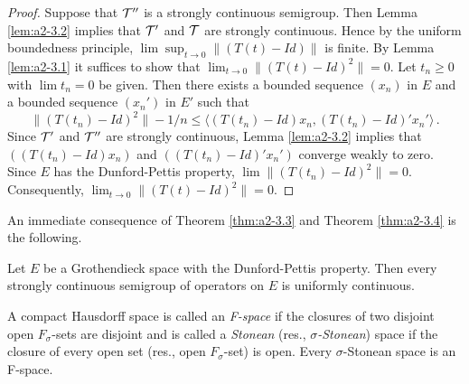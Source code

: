 \begin{proof}
Suppose that $\mathcal{T}''$ is a strongly continuous semigroup.
Then Lemma \ref{lem:a2-3.2}   implies that $\mathcal{T}'$ and $\mathcal{T}$ are strongly continuous.
Hence by the uniform boundedness principle, $\lim \sup_{t \to 0} \|(T(t) - Id)\|$ is finite.
By Lemma \ref{lem:a2-3.1}   it suffices to show that $\lim_{t \to 0} \|(T(t) - Id)^2\| = 0$.
Let $t_{n} \geq 0$ with $\lim t_{n} = 0$ be given.
Then there exists a bounded sequence $(x_{n})$ in $E$ and a bounded sequence $(x_{n}')$ in $E'$ such that
\[
\|(T(t_{n}) - Id)^2\| - 1/n \leq \langle (T(t_{n}) - Id)x_{n}, (T(t_{n}) - Id)'x_{n}' \rangle\,.
\]
Since $\mathcal{T}'$ and $\mathcal{T}''$ are strongly continuous, Lemma \ref{lem:a2-3.2}   implies that $((T(t_{n}) - Id)x_{n})$ and $((T(t_{n}) - Id)'x_{n}')$ converge weakly to zero.
Since $E$ has the Dunford-Pettis property, $\lim \|(T(t_{n}) - Id)^2\| = 0$.
Consequently, $\lim_{t \to 0} \|(T(t) - Id)^2\| = 0$.
\end{proof}

An immediate consequence of Theorem \ref{thm:a2-3.3}   and Theorem \ref{thm:a2-3.4}   is the following.

\begin{theorem}\label{thm:a2-3.5}
Let $E$ be a Grothendieck space with the Dunford-Pettis property.
Then every strongly continuous semigroup of operators on $E$ is uniformly continuous.
\end{theorem}
A compact Hausdorff space is called an \emph{F-space} if the closures of two disjoint open $F_{\sigma}$-sets are disjoint and is called a \emph{Stonean} (res., \emph{$\sigma$-Stonean}) space if the closure of every open set (res., open $F_{\sigma}$-set) is open.
Every $\sigma$-Stonean space is an F-space.

